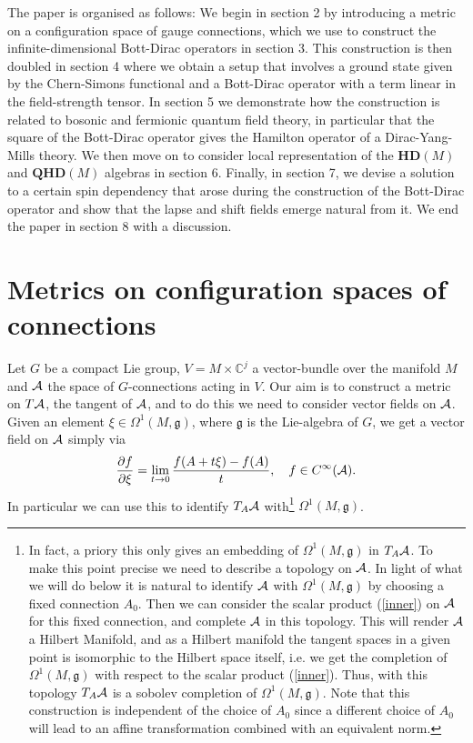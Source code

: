 \documentclass[12pt]{article}
\def\OO{\Omega}
\def\ca{{\cal A}}
\newcommand{\pa}{\partial}
\begin{document}
The paper is organised as follows: We begin in section 2 by introducing a metric on a configuration space of gauge connections, which we use to construct the infinite-dimensional Bott-Dirac operators in section 3. This construction is then doubled in section 4 where we obtain a setup that involves a ground state given by the Chern-Simons functional and a Bott-Dirac operator with a term linear in the field-strength tensor. In section 5 we demonstrate how the construction is related to bosonic and fermionic quantum field theory, in particular that the square of the Bott-Dirac operator gives the Hamilton operator of a Dirac-Yang-Mills theory. We then move on to consider local representation of the $\mathbf{HD}(M)$ and $\mathbf{QHD}(M)$ algebras in section 6. Finally, in section 7, we devise a solution to a certain spin dependency that arose during the construction of the Bott-Dirac operator and show that the lapse and shift fields emerge natural from it. We end the paper in section 8 with a discussion.







\section{Metrics on configuration spaces of connections}
\label{ovn2}




Let $G$ be a compact Lie group, $V=M\times \mathbb{C}^j$ a vector-bundle over the manifold $M$ and $\ca$ the space of $G$-connections acting in $V$. Our aim is to construct a metric on $T\ca$, the tangent of $\ca$, and to do this we need to consider vector fields on $\ca$. Given an element $\xi\in \OO^1(M, \mathfrak{g})$, where $\mathfrak{g}$ is the Lie-algebra of $G$, we get a vector field on $\ca$ simply via 
\begin{equation}
\frac{\pa f}{\pa \xi} = \lim_{t\rightarrow 0} \frac{f(A + t\xi) - f(A)}{t}, \quad f\in C^\infty(\ca).
\label{mozart}
\end{equation}
In particular we can use this to identify $T_A\ca  $  with\footnote{In fact, a priory this only gives an embedding of $\Omega^1(M,\mathfrak{g})$ in $T_A\ca$. To make this point precise we need to describe a topology on $\ca$. In light of what we will do below it is natural to identify $\ca$ with $\Omega^1(M,\mathfrak{g})$ by choosing a fixed connection $A_0$. Then we can consider the scalar product (\ref{inner}) on $\ca$ for this fixed connection, and complete $\ca$ in this topology. This will render $\ca$ a Hilbert Manifold, and as a Hilbert manifold the tangent spaces in a given point is isomorphic to the Hilbert space itself, i.e. we get the completion of $\Omega^1 (M,\mathfrak{g})$ with respect to the scalar product (\ref{inner}). Thus, with this topology $T_A\ca$ is a sobolev completion of $\Omega^1 (M,\mathfrak{g})$.
Note that this construction is independent of the choice of $A_0$ since a different choice of $A_0$ will lead to an affine transformation combined with an equivalent norm.  } $\OO^1(M, \mathfrak{g})$.
\end{document}
